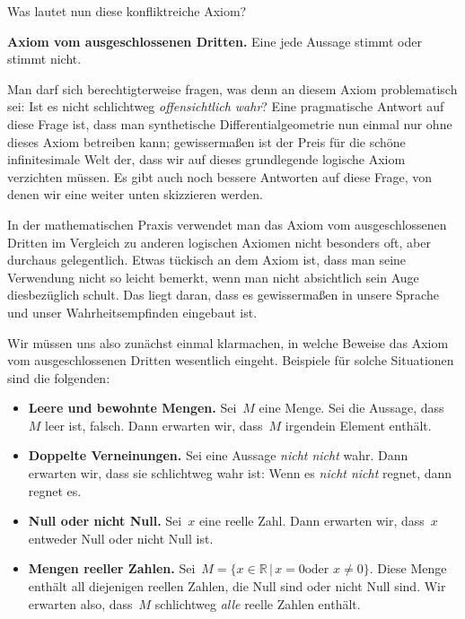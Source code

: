 \documentclass[twoside]{../zirkelblatt}
\newcommand{\RR}{\mathbb{R}}
\theoremstyle{definition}
\theoremstyle{plain}
\theoremstyle{remark}
\begin{document}
Was lautet nun diese konfliktreiche Axiom?

\begin{shaded}
\textbf{Axiom vom ausgeschlossenen Dritten.} Eine jede Aussage stimmt oder
stimmt nicht.
\end{shaded}

Man darf sich berechtigterweise fragen, was denn an diesem Axiom problematisch
sei: Ist es nicht schlichtweg \emph{offensichtlich wahr}? Eine pragmatische
Antwort auf diese Frage ist, dass man synthetische Differentialgeometrie nun einmal
nur ohne dieses Axiom betreiben kann; gewissermaßen ist der Preis für die
schöne infinitesimale Welt der, dass wir auf dieses grundlegende logische Axiom
verzichten müssen. Es gibt auch noch bessere Antworten auf diese Frage, von
denen wir eine weiter unten skizzieren werden.

In der mathematischen Praxis verwendet man das Axiom vom ausgeschlossenen
Dritten im Vergleich zu anderen logischen Axiomen nicht besonders oft, aber
durchaus gelegentlich. Etwas tückisch an dem Axiom ist, dass man seine
Verwendung nicht so leicht bemerkt, wenn man nicht absichtlich sein Auge
diesbezüglich schult. Das liegt daran, dass es gewissermaßen in unsere Sprache
und unser Wahrheitsempfinden eingebaut ist.

Wir müssen uns also zunächst einmal klarmachen, in welche Beweise das Axiom vom
ausgeschlossenen Dritten wesentlich eingeht. Beispiele für solche
Situationen sind die folgenden:

\begin{itemize}
\item \textbf{Leere und bewohnte Mengen.} Sei~$M$ eine Menge. Sei die Aussage,
dass~$M$ leer ist, falsch. Dann erwarten wir, dass~$M$ irgendein Element
enthält.
\item \textbf{Doppelte Verneinungen.} Sei eine Aussage \emph{nicht nicht} wahr.
Dann erwarten wir, dass sie schlichtweg wahr ist: Wenn es \emph{nicht nicht}
regnet, dann regnet es.
\item \textbf{Null oder nicht Null.} Sei~$x$ eine reelle Zahl. Dann erwarten wir,
dass~$x$ entweder Null oder nicht Null ist.
\item \textbf{Mengen reeller Zahlen.} Sei~$M = \{ x \in \RR \,|\, \text{$x = 0$
oder $x \neq 0$} \}$. Diese Menge enthält all diejenigen reellen Zahlen, die Null sind
oder nicht Null sind. Wir erwarten also, dass~$M$ schlichtweg \emph{alle}
reelle Zahlen enthält.
\end{itemize}
\end{document}
